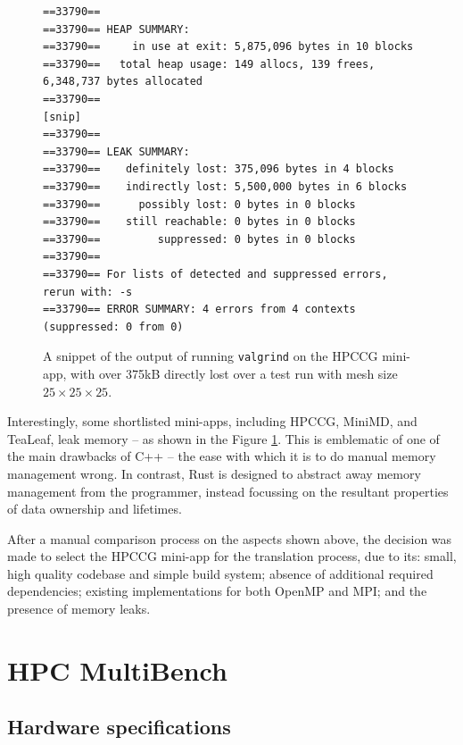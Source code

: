 \begin{figure}[H]
\begin{verbatim}
==33790== 
==33790== HEAP SUMMARY:
==33790==     in use at exit: 5,875,096 bytes in 10 blocks
==33790==   total heap usage: 149 allocs, 139 frees, 6,348,737 bytes allocated
==33790== 
[snip]
==33790== 
==33790== LEAK SUMMARY:
==33790==    definitely lost: 375,096 bytes in 4 blocks
==33790==    indirectly lost: 5,500,000 bytes in 6 blocks
==33790==      possibly lost: 0 bytes in 0 blocks
==33790==    still reachable: 0 bytes in 0 blocks
==33790==         suppressed: 0 bytes in 0 blocks
==33790== 
==33790== For lists of detected and suppressed errors, rerun with: -s
==33790== ERROR SUMMARY: 4 errors from 4 contexts (suppressed: 0 from 0)
\end{verbatim}
    \caption{A snippet of the output of running \texttt{valgrind} on the HPCCG mini-app, with over 375kB directly lost over a test run with mesh size $25 \times 25 \times 25$.}
    \label{fig:minimdValgrindOutput}
\end{figure}

Interestingly, some shortlisted mini-apps, including HPCCG, MiniMD, and TeaLeaf, leak memory -- as shown in the Figure \ref{fig:minimdValgrindOutput}. This is emblematic of one of the main drawbacks of C++ -- the ease with which it is to do manual memory management wrong. In contrast, Rust is designed to abstract away memory management from the programmer, instead focussing on the resultant properties of data ownership and lifetimes.

After a manual comparison process on the aspects shown above, the decision was made to select the HPCCG mini-app for the translation process, due to its: small, high quality codebase and simple build system; absence of additional required dependencies; existing implementations for both OpenMP and MPI; and the presence of memory leaks.





\chapter{HPC MultiBench}
\label{ch:tooling-appendix}

\section{Hardware specifications}
\label{sec:tooling-replication-yaml}

